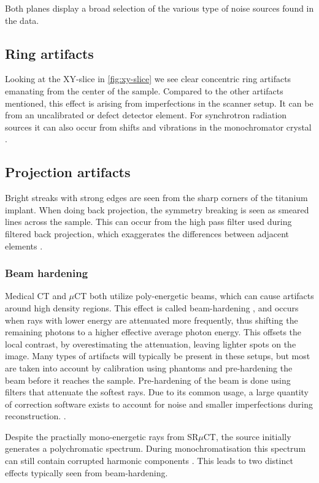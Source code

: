 Both planes display a broad selection of the various type of noise sources found in the data.

\subsection{Ring artifacts}

Looking at the XY-slice in \cref{fig:xy-slice} we see clear concentric ring artifacts emanating from
the center of the sample. Compared to the other artifacts mentioned, this effect is arising from
imperfections in the scanner setup. It can be from an uncalibrated or defect detector element. For
synchrotron radiation sources it can also occur from shifts and vibrations in the monochromator
crystal \citep{ringartifacts}.

\subsection{Projection artifacts}

Bright streaks with strong edges are seen from the sharp corners of the titanium implant. When
doing back projection, the symmetry breaking is seen as smeared lines across the sample. This
can occur from the high pass filter used during filtered back projection, which exaggerates the
differences between adjacent elements \citep{ctnoise}.

\subsubsection{Beam hardening}\label{sec:beam-hardening}

Medical CT and $\mu$CT both utilize poly-energetic beams, which can cause artifacts around high
density regions. This effect is called beam-hardening , and occurs when rays with
lower energy are attenuated more frequently, thus shifting the remaining photons to a higher
effective average photon energy. This offsets the local contrast, by overestimating
the attenuation, leaving lighter spots on the image. Many types of artifacts will typically be
present in these setups, but most are taken into account by calibration using phantoms and
pre-hardening the beam before it reaches the sample. Pre-hardening of the beam is done using
filters that attenuate the softest rays. Due to its common usage, a large quantity of correction software exists
to account for noise and smaller imperfections during reconstruction. .

Despite the practially mono-energetic rays from SR$\mu$CT, the source initially generates a
polychromatic spectrum. During monochromatisation this spectrum can still contain corrupted harmonic
components \citep{srnoise}. This leads to two distinct effects typically seen from beam-hardening.

